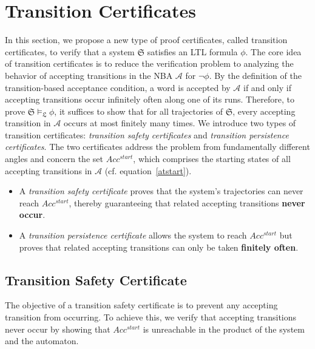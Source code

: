 \section{Transition Certificates}
\label{sec:method}
In this section, we propose a new type of proof certificates, called transition certificates, to verify that a system $\mathfrak{S}$ satisfies an LTL formula $\phi$. The core idea of transition certificates is to reduce the verification problem to analyzing the behavior of accepting transitions in the NBA $\mathcal{A}$ for $\neg\phi$. By the definition of the transition-based acceptance condition, a word is accepted by $\mathcal{A}$ if and only if accepting transitions occur infinitely often along one of its runs. Therefore, to prove $\mathfrak{S} \models_{\mathfrak{L}} \phi$, it suffices to show that for all trajectories of $\mathfrak{S}$, every accepting transition in $\mathcal{A}$ occurs at most finitely many times. We introduce two types of transition certificates: \emph{transition safety certificates} and \emph{transition persistence certificates}. The two certificates address the problem from fundamentally different angles and concern the set $Acc^{start}$, which comprises the starting states of all accepting transitions in $\mathcal{A}$ (cf. equation~\ref{atstart}).

\begin{itemize}
    \item A \emph{transition safety certificate} proves that the system's trajectories can never reach $Acc^{start}$, thereby guaranteeing that related accepting transitions \textbf{never occur}.
    \item A \emph{transition persistence certificate} allows the system to reach $Acc^{start}$ but proves that related accepting transitions can only be taken \textbf{finitely often}.
\end{itemize}


\subsection{Transition Safety Certificate}

The objective of a transition safety certificate​ is to prevent any accepting transition from occurring. To achieve this, we verify that accepting transitions never occur by showing that $Acc^{start}$ is​ unreachable in the product of the system and the automaton.

